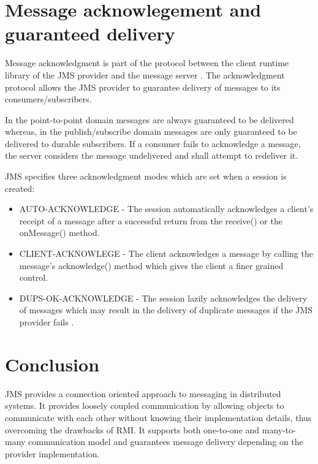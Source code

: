 \documentclass[9pt,twocolumn,twoside]{styles/osajnl}
\begin{document}
\section{Message acknowlegement and guaranteed delivery}


Message acknowledgment is part of the protocol between the client
runtime library of the JMS provider and the message server
\cite{www-jms-fischli-article}. The acknowledgment protocol allows the
JMS provider to guarantee delivery of messages to its
consumers/subscribers.

In the point-to-point domain messages are always guaranteed to be
delivered whereas, in the publish/subscribe domain messages are only
guaranteed to be delivered to durable subscribers.  If a consumer
fails to acknowledge a message, the server considers the message
undelivered and shall attempt to redeliver it.

JMS specifies three acknowledgment modes which are set when a session
is created:
\begin{itemize}
\item AUTO-ACKNOWLEDGE - The session automatically acknowledges
a client's receipt of a message after a successful return from the
receive() or the onMessage() method.
\item CLIENT-ACKNOWLEGE - The client
acknowledges a message by calling the message's acknowledge() method
which gives the client a finer grained control.
\item DUPS-OK-ACKNOWLEDGE - The session lazily acknowledges the
delivery of messages which may result in the delivery of duplicate
messages if the JMS provider fails \cite{www-jms-fischli-article}.

\end{itemize}


\section{Conclusion}
JMS provides a connection oriented approach to messaging in
distributed systems. It provides loosely coupled communication by
allowing objects to communicate with each other without knowing their
implementation details, thus overcoming the drawbacks of RMI. It
supports both one-to-one and many-to-many communication model and
guarantees message delivery depending on the provider implementation.




\end{document}
